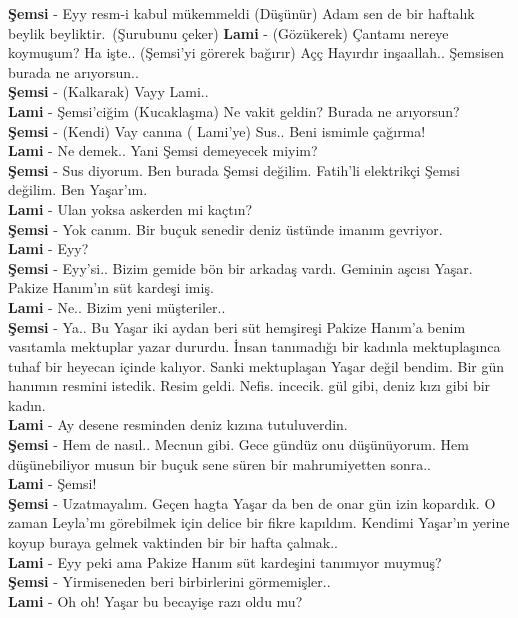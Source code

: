 \documentclass[]{book}
\begin{document}
\textbf{Şemsi} - Eyy resm-i kabul mükemmeldi (Düşünür) Adam sen de bir haftalık beylik beyliktir.~(Şurubunu çeker)
\textbf{Lami} - (Gözükerek) Çantamı nereye koymuşum? Ha işte.. (Şemsi'yi görerek bağırır) Açç Hayırdır inşaallah.. Şemsisen burada ne arıyorsun..\\
\textbf{Şemsi} - (Kalkarak) Vayy Lami..\\
\textbf{Lami} - Şemsi'ciğim (Kucaklaşma) Ne vakit geldin? Burada ne arıyorsun?\\
\textbf{Şemsi} - (Kendi) Vay canına ( Lami'ye) Sus.. Beni ismimle çağırma!\\
\textbf{Lami} - Ne demek.. Yani Şemsi demeyecek miyim?\\
\textbf{Şemsi} - Sus diyorum. Ben burada Şemsi değilim. Fatih'li elektrikçi Şemsi değilim. Ben Yaşar'ım.\\
\textbf{Lami} - Ulan yoksa askerden mi kaçtın?\\
\textbf{Şemsi} - Yok canım. Bir buçuk senedir deniz üstünde imanım gevriyor.\\
\textbf{Lami} - Eyy?\\
\textbf{Şemsi} - Eyy'si.. Bizim gemide bön bir arkadaş vardı. Geminin aşcısı Yaşar. Pakize Hanım'ın süt kardeşi imiş.\\
\textbf{Lami} - Ne.. Bizim yeni müşteriler..\\
\textbf{Şemsi} - Ya.. Bu Yaşar iki aydan beri süt hemşireşi Pakize Hanım'a benim vasıtamla mektuplar yazar dururdu. İnsan tanımadığı bir kadınla mektuplaşınca tuhaf bir heyecan içinde kalıyor. Sanki mektuplaşan Yaşar değil bendim. Bir gün hanımın resmini istedik. Resim geldi. Nefis. incecik. gül gibi, deniz kızı gibi bir kadın.\\
\textbf{Lami} - Ay desene resminden deniz kızına tutuluverdin.\\
\textbf{Şemsi} - Hem de nasıl.. Mecnun gibi. Gece gündüz onu düşünüyorum. Hem düşünebiliyor musun bir buçuk sene süren bir mahrumiyetten sonra..\\
\textbf{Lami} - Şemsi!\\
\textbf{Şemsi} - Uzatmayalım. Geçen hagta Yaşar da ben de onar gün izin kopardık. O zaman Leyla'mı görebilmek için delice bir fikre kapıldım. Kendimi Yaşar'ın yerine koyup buraya gelmek vaktinden bir bir hafta çalmak..\\
\textbf{Lami} - Eyy peki ama Pakize Hanım süt kardeşini tanımıyor muymuş?\\
\textbf{Şemsi} - Yirmiseneden beri birbirlerini görmemişler..\\
\textbf{Lami} - Oh oh! Yaşar bu becayişe razı oldu mu?\\
\end{document}

